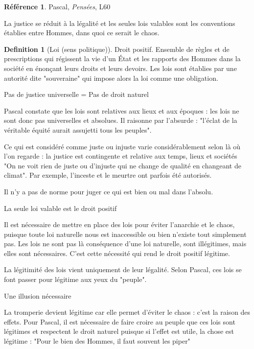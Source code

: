 \documentclass[french]{book}
\theoremstyle{definition}
\newtheorem*{dfn}{Definition}
\newtheorem*{refe}{Référence}
\begin{document}
\begin{refe}
	Pascal, \textit{Pensées}, L60
\end{refe}

La justice se réduit à la légalité et les seules lois valables sont les conventions établies entre Hommes, dans quoi ce serait le chaos.

\begin{dfn}[Loi (sens politique)]
Droit positif. Ensemble de règles et de prescriptions qui régissent la vie d'un État et les rapports des Hommes dans la société en énonçant leurs droits et leurs devoirs. Les lois sont établies par une autorité dite "souveraine" qui impose alors la loi comme une obligation.
\end{dfn}


Pas de justice universelle = Pas de droit naturel

Pascal constate que les lois sont relatives aux lieux et aux époques : les lois ne sont donc pas universelles et absolues.
Il raisonne par l'absurde : "l'éclat de la véritable équité aurait assujetti tous les peuples".

Ce qui est considéré comme juste ou injuste varie considérablement selon là où l'on regarde : la justice est contingente et relative aux temps, lieux et sociétés "On ne voit rien de juste ou d'injuste qui ne change de qualité en changeant de climat".
Par exemple, l'inceste et le meurtre ont parfois été autorisés.

Il n'y a pas de norme pour juger ce qui est bien ou mal dans l'absolu.

La seule loi valable est le droit positif

Il est nécessaire de mettre en place des lois pour éviter l'anarchie et le chaos, puisque toute loi naturelle nous est inaccessible ou bien n'existe tout simplement pas.
Les lois ne sont pas là conséquence d'une loi naturelle, sont illégitimes, mais elles sont nécessaires. C'est cette nécessité qui rend le droit positif légitime.

La légitimité des lois vient uniquement de leur légalité. Selon Pascal, ces lois se font passer pour légitime aux yeux du "peuple".

Une illusion nécessaire

La tromperie devient légitime car elle permet d'éviter le chaos : c'est la raison des effets.
Pour Pascal, il est nécessaire de faire croire au peuple que ces lois sont légitimes et respectent le droit naturel puisque si l'effet est utile, la chose est légitime :
"Pour le bien des Hommes, il faut souvent les piper"
\end{document}
